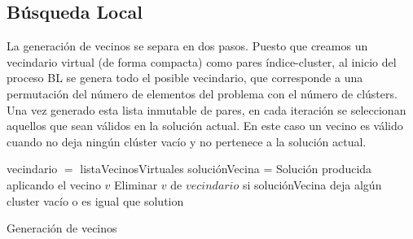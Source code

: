 
\newpage

\subsection{Búsqueda Local}

La generación de vecinos se separa en dos pasos. Puesto que creamos un vecindario virtual (de forma compacta) como pares índice-cluster, al inicio del proceso BL se genera todo el posible vecindario, que corresponde a una permutación del número de elementos del problema con el número de clústers.
Una vez generado esta lista inmutable de pares, en cada iteración se seleccionan aquellos que sean válidos en la solución actual. En este caso un vecino es válido cuando no deja ningún clúster vacío y no pertenece a la solución actual. \\

\begin{algorithm}[H]
    \SetAlgoLined
        vecindario $=$ listaVecinosVirtuales \;
         {
            soluciónVecina = Solución producida aplicando el vecino $v$ \;
            Eliminar $v$ de $vecindario$ si soluciónVecina deja algún cluster vacío o es igual que solution \;
        }
    \caption{Generación de vecinos}
\end{algorithm}




\vspace{\baselineskip}

